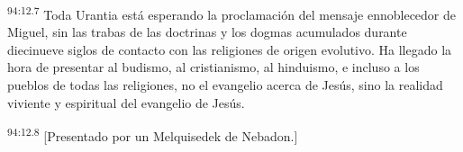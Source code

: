 \par
\textsuperscript{94:12.7} Toda Urantia está esperando la proclamación del mensaje ennoblecedor de Miguel, sin las trabas de las doctrinas y los dogmas acumulados durante diecinueve siglos de contacto con las religiones de origen evolutivo. Ha llegado la hora de presentar al budismo, al cristianismo, al hinduismo, e incluso a los pueblos de todas las religiones, no el evangelio acerca de Jesús, sino la realidad viviente y espiritual del evangelio de Jesús.

\par
\textsuperscript{94:12.8} [Presentado por un Melquisedek de Nebadon.]